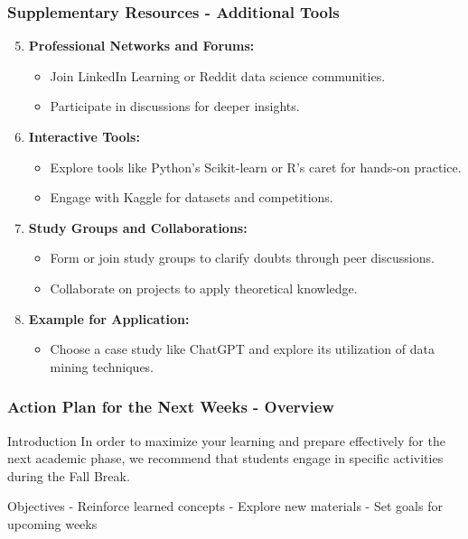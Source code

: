 \documentclass[aspectratio=169]{beamer}
\begin{document}
\begin{frame}[fragile]
    \frametitle{Supplementary Resources - Additional Tools}
    \begin{enumerate}
        \setcounter{enumi}{4}
        \item \textbf{Professional Networks and Forums:}
            \begin{itemize}
                \item Join LinkedIn Learning or Reddit data science communities.
                \item Participate in discussions for deeper insights.
            \end{itemize}

        \item \textbf{Interactive Tools:}
            \begin{itemize}
                \item Explore tools like Python’s Scikit-learn or R’s caret for hands-on practice.
                \item Engage with Kaggle for datasets and competitions.
            \end{itemize}

        \item \textbf{Study Groups and Collaborations:}
            \begin{itemize}
                \item Form or join study groups to clarify doubts through peer discussions.
                \item Collaborate on projects to apply theoretical knowledge.
            \end{itemize}

        \item \textbf{Example for Application:}
            \begin{itemize}
                \item Choose a case study like ChatGPT and explore its utilization of data mining techniques.
            \end{itemize}
    \end{enumerate}
\end{frame}

\begin{frame}[fragile]
    \frametitle{Action Plan for the Next Weeks - Overview}
    \begin{block}{Introduction}
        In order to maximize your learning and prepare effectively for the next academic phase, we recommend that students engage in specific activities during the Fall Break.
    \end{block}
    \begin{block}{Objectives}
        - Reinforce learned concepts
        - Explore new materials
        - Set goals for upcoming weeks
    \end{block}
\end{frame}
\end{document}
